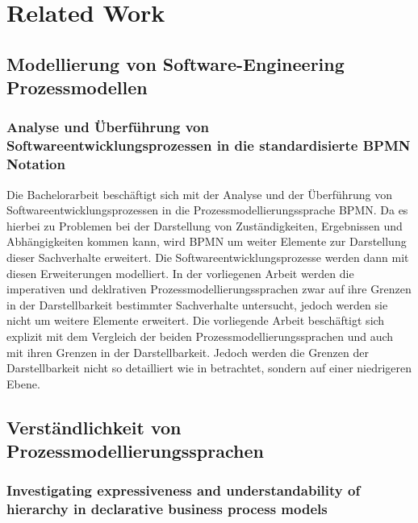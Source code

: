 \chapter{Related Work}\label{sec:chapter9}

\section{Modellierung von Software-Engineering Prozessmodellen}

\subsection {Analyse und Überführung von Softwareentwicklungsprozessen in die standardisierte BPMN Notation}
Die Bachelorarbeit \cite{Menhorn2014} beschäftigt sich mit der Analyse und der Überführung von Softwareentwicklungsprozessen in die Prozessmodellierungssprache BPMN. Da es hierbei zu Problemen bei der Darstellung von Zuständigkeiten, Ergebnissen und Abhängigkeiten kommen kann, wird BPMN um weiter Elemente zur Darstellung dieser Sachverhalte erweitert. Die Softwareentwicklungsprozesse werden dann mit diesen Erweiterungen modelliert.\newline
In der vorliegenen Arbeit werden die imperativen und deklrativen Prozessmodellierungssprachen zwar auf ihre Grenzen in der Darstellbarkeit bestimmter Sachverhalte untersucht, jedoch werden sie nicht um weitere Elemente erweitert. Die vorliegende Arbeit beschäftigt sich explizit mit dem Vergleich der beiden Prozessmodellierungssprachen und auch mit ihren Grenzen in der Darstellbarkeit. Jedoch werden die Grenzen der Darstellbarkeit nicht so detailliert wie in \cite{Menhorn2014} betrachtet, sondern auf einer niedrigeren Ebene. \newline


\section{Verständlichkeit von Prozessmodellierungssprachen}

\subsection{Investigating expressiveness and understandability of hierarchy
in declarative business process models}

